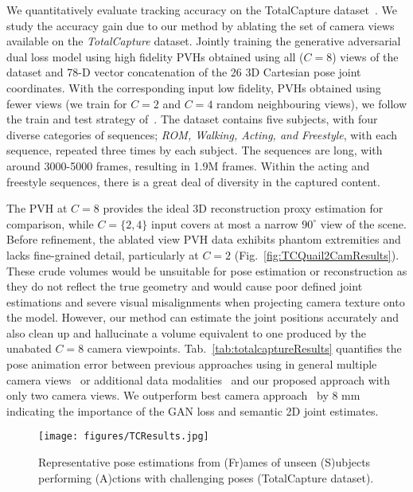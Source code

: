 \documentclass{bmvc2k}
\begin{document}
We quantitatively evaluate tracking accuracy on the TotalCapture dataset~\cite{trumble_total_2017}. 
We study the accuracy gain due to our method by ablating the set of camera views available on the {\em TotalCapture} dataset.  Jointly training the generative adversarial dual loss model using high fidelity PVHs obtained using all ($C=8$) views of the dataset and 78-D vector concatenation of the 26 3D Cartesian pose joint coordinates. With the corresponding input low fidelity, PVHs obtained using fewer views (we train for $C=2$ and $C=4$ random neighbouring views), we follow the train and test strategy of~\cite{trumble_total_2017}. The dataset contains five subjects, with four diverse categories of sequences; \emph{ROM, Walking, Acting, and Freestyle}, with each sequence, repeated three times by each subject. The sequences are long, with around 3000-5000 frames, resulting in 1.9M frames. Within the acting and freestyle sequences, there is a great deal of diversity in the captured content.


 The PVH at $C=8$ provides the ideal 3D reconstruction proxy estimation for comparison, while $C=\{2,4\}$ input covers at most a narrow $90^\circ$ view of the scene.  Before refinement, the ablated view PVH data exhibits phantom extremities and lacks fine-grained detail, particularly at $C=2$ (Fig.~\ref{fig:TCQuail2CamResults}). These crude volumes would be unsuitable for pose estimation or reconstruction as they do not reflect the true geometry and would cause poor defined joint estimations and severe visual misalignments when projecting camera texture onto the model. However, our method can estimate the joint positions accurately and also clean up and hallucinate a volume equivalent to one produced by the unabated $C=8$ camera viewpoints. Tab.~\ref{tab:totalcaptureResults} quantifies the pose animation error between previous approaches using in general multiple camera views~\cite{cao2016realtimeCPM,TrumbleCVMP2DConvNet,trumble_total_2017,trumble:eccv:2018} or additional data modalities~\cite{trumble_total_2017,PonsECCV18} and our proposed approach with only two camera views. 
We outperform best camera approach~\cite{Qiu:iccv:2019} by 8 mm indicating the importance of the GAN loss and semantic 2D joint estimates.
 
\begin{figure}[htb]
\centering
\texttt{[image: figures/TCResults.jpg]}
\caption{Representative pose estimations from (Fr)ames of unseen (S)ubjects performing (A)ctions with challenging poses (TotalCapture dataset).}
\label{fig:TCResults}
\end{figure}
\end{document}
